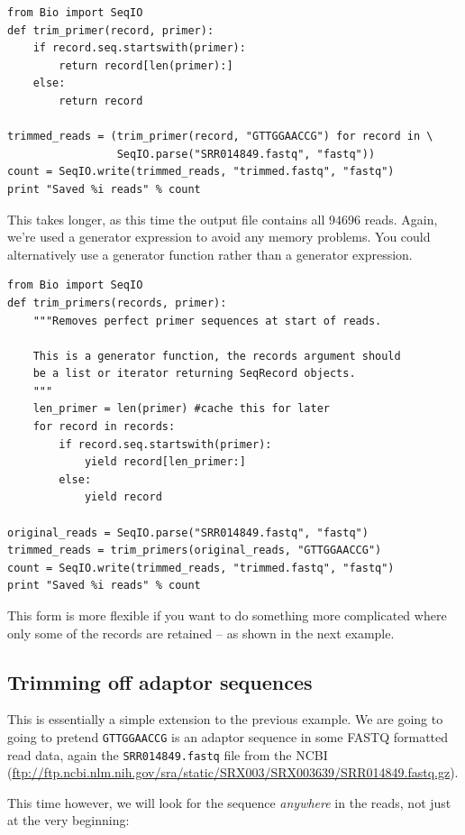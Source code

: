 \documentclass{report}
\begin{document}
\begin{verbatim}
from Bio import SeqIO
def trim_primer(record, primer):
    if record.seq.startswith(primer):
        return record[len(primer):]
    else:
        return record

trimmed_reads = (trim_primer(record, "GTTGGAACCG") for record in \
                 SeqIO.parse("SRR014849.fastq", "fastq"))
count = SeqIO.write(trimmed_reads, "trimmed.fastq", "fastq")
print "Saved %i reads" % count
\end{verbatim}

This takes longer, as this time the output file contains all $94696$ reads.
Again, we're used a generator expression to avoid any memory problems.
You could alternatively use a generator function rather than a generator
expression.

\begin{verbatim}
from Bio import SeqIO
def trim_primers(records, primer):
    """Removes perfect primer sequences at start of reads.
    
    This is a generator function, the records argument should
    be a list or iterator returning SeqRecord objects.
    """
    len_primer = len(primer) #cache this for later
    for record in records:
        if record.seq.startswith(primer):
            yield record[len_primer:]
        else:
            yield record

original_reads = SeqIO.parse("SRR014849.fastq", "fastq")
trimmed_reads = trim_primers(original_reads, "GTTGGAACCG")
count = SeqIO.write(trimmed_reads, "trimmed.fastq", "fastq") 
print "Saved %i reads" % count
\end{verbatim}

This form is more flexible if you want to do something more complicated
where only some of the records are retained -- as shown in the next example.

\subsection{Trimming off adaptor sequences}
\label{sec:FASTQ-slicing-off-adaptor}

This is essentially a simple extension to the previous example. We are going
to going to pretend \texttt{GTTGGAACCG} is an adaptor sequence in some FASTQ
formatted read data, again the \texttt{SRR014849.fastq} file from the NCBI
(\url{ftp://ftp.ncbi.nlm.nih.gov/sra/static/SRX003/SRX003639/SRR014849.fastq.gz}).

This time however, we will look for the sequence \emph{anywhere} in the reads,
not just at the very beginning:
\end{document}
